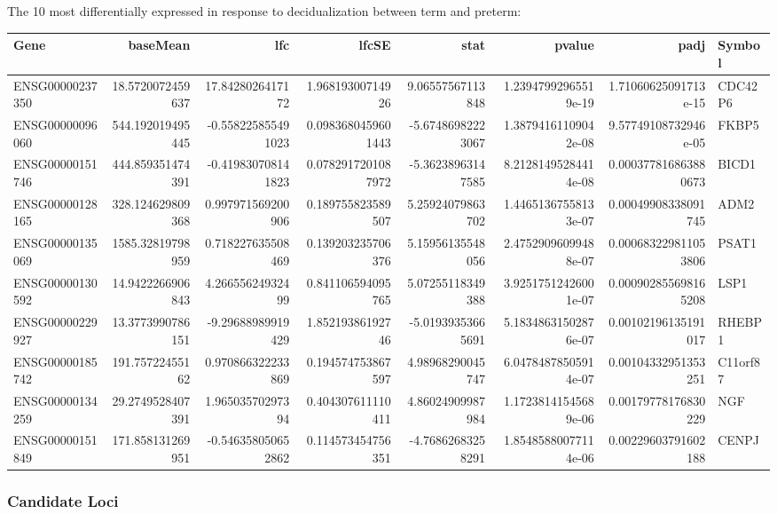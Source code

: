 The 10 most differentially expressed in response to decidualization  between term and preterm:
\begin{center}
\begin{tabular}{lrrrrrrl}
Gene & baseMean & lfc & lfcSE & stat & pvalue & padj & Symbol\\
\hline
ENSG00000237350 & 18.5720072459637 & 17.8428026417172 & 1.96819300714926 & 9.06557567113848 & 1.23947992965519e-19 & 1.71060625091713e-15 & CDC42P6\\
ENSG00000096060 & 544.192019495445 & -0.558225855491023 & 0.0983680459601443 & -5.67486982223067 & 1.38794161109042e-08 & 9.57749108732946e-05 & FKBP5\\
ENSG00000151746 & 444.859351474391 & -0.419830708141823 & 0.0782917201087972 & -5.36238963147585 & 8.21281495284414e-08 & 0.000377816863880673 & BICD1\\
ENSG00000128165 & 328.124629809368 & 0.997971569200906 & 0.189755823589507 & 5.25924079863702 & 1.44651367558133e-07 & 0.00049908338091745 & ADM2\\
ENSG00000135069 & 1585.32819798959 & 0.718227635508469 & 0.139203235706376 & 5.15956135548056 & 2.47529096099488e-07 & 0.000683229811053806 & PSAT1\\
ENSG00000130592 & 14.9422266906843 & 4.26655624932499 & 0.841106594095765 & 5.07255118349388 & 3.92517512426001e-07 & 0.000902855698165208 & LSP1\\
ENSG00000229927 & 13.3773990786151 & -9.29688989919429 & 1.85219386192746 & -5.01939353665691 & 5.18348631502876e-07 & 0.00102196135191017 & RHEBP1\\
ENSG00000185742 & 191.75722455162 & 0.970866322233869 & 0.194574753867597 & 4.98968290045747 & 6.04784878505914e-07 & 0.00104332951353251 & C11orf87\\
ENSG00000134259 & 29.2749528407391 & 1.96503570297394 & 0.404307611110411 & 4.86024909987984 & 1.17238141545689e-06 & 0.00179778176830229 & NGF\\
ENSG00000151849 & 171.858131269951 & -0.546358050652862 & 0.114573454756351 & -4.76862683258291 & 1.85485880077114e-06 & 0.00229603791602188 & CENPJ\\
\end{tabular}
\end{center}




\subsubsection{Candidate Loci}\label{sec:org91a5cf4}


